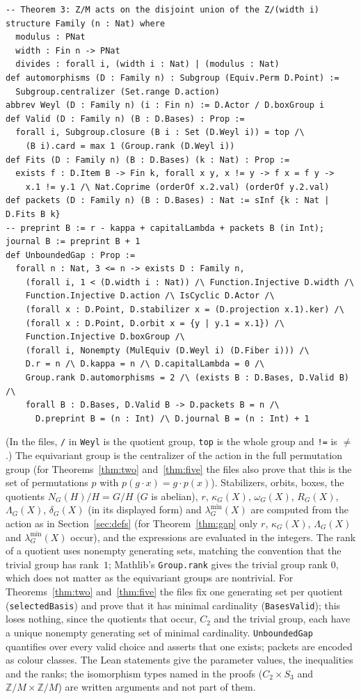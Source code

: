 \documentclass[11pt]{article}
\theoremstyle{remark}
\newcommand{\lmin}{\lambda^{\min}}
\begin{document}
{\begin{verbatim}
-- Theorem 3: Z/M acts on the disjoint union of the Z/(width i)
structure Family (n : Nat) where
  modulus : PNat
  width : Fin n -> PNat
  divides : forall i, (width i : Nat) | (modulus : Nat)
def automorphisms (D : Family n) : Subgroup (Equiv.Perm D.Point) :=
  Subgroup.centralizer (Set.range D.action)
abbrev Weyl (D : Family n) (i : Fin n) := D.Actor / D.boxGroup i
def Valid (D : Family n) (B : D.Bases) : Prop :=
  forall i, Subgroup.closure (B i : Set (D.Weyl i)) = top /\
    (B i).card = max 1 (Group.rank (D.Weyl i))
def Fits (D : Family n) (B : D.Bases) (k : Nat) : Prop :=
  exists f : D.Item B -> Fin k, forall x y, x != y -> f x = f y ->
    x.1 != y.1 /\ Nat.Coprime (orderOf x.2.val) (orderOf y.2.val)
def packets (D : Family n) (B : D.Bases) : Nat := sInf {k : Nat | D.Fits B k}
-- preprint B := r - kappa + capitalLambda + packets B (in Int); journal B := preprint B + 1
def UnboundedGap : Prop :=
  forall n : Nat, 3 <= n -> exists D : Family n,
    (forall i, 1 < (D.width i : Nat)) /\ Function.Injective D.width /\
    Function.Injective D.action /\ IsCyclic D.Actor /\
    (forall x : D.Point, D.stabilizer x = (D.projection x.1).ker) /\
    (forall x : D.Point, D.orbit x = {y | y.1 = x.1}) /\
    Function.Injective D.boxGroup /\
    (forall i, Nonempty (MulEquiv (D.Weyl i) (D.Fiber i))) /\
    D.r = n /\ D.kappa = n /\ D.capitalLambda = 0 /\
    Group.rank D.automorphisms = 2 /\ (exists B : D.Bases, D.Valid B) /\
    forall B : D.Bases, D.Valid B -> D.packets B = n /\
      D.preprint B = (n : Int) /\ D.journal B = (n : Int) + 1
\end{verbatim}}
\noindent (In the files, \texttt{/} in \texttt{Weyl} is the quotient group,
\texttt{top} is the whole group and \texttt{!=} is $\ne$.) The equivariant
group is the centralizer of the action in the full permutation group (for
Theorems~\ref{thm:two} and~\ref{thm:five} the files also prove that this is
the set of permutations $p$ with $p(g\cdot x)=g\cdot p(x)$). Stabilizers,
orbits, boxes, the quotients $N_G(H)/H=G/H$ ($G$ is abelian), $r$,
$\kappa_G(X)$, $\omega_G(X)$, $R_G(X)$, $\Lambda_G(X)$, $\delta_G(X)$ (in its
displayed form) and $\lmin_G(X)$ are computed from the action as in
Section~\ref{sec:defs} (for Theorem~\ref{thm:gap} only $r$, $\kappa_G(X)$,
$\Lambda_G(X)$ and $\lmin_G(X)$ occur), and the expressions are evaluated in
the integers.
The rank of a quotient uses nonempty generating sets, matching the convention
that the trivial group has rank~$1$; Mathlib's \texttt{Group.rank} gives the
trivial group rank $0$, which does not matter as the equivariant groups are
nontrivial. For Theorems~\ref{thm:two} and~\ref{thm:five} the files fix one
generating set per quotient (\texttt{selectedBasis}) and prove that it
has minimal cardinality (\texttt{BasesValid}); this loses nothing, since the
quotients that occur, $C_2$ and the trivial group, each have a unique nonempty
generating set of minimal cardinality. \texttt{UnboundedGap} quantifies over every valid choice and
asserts that one exists; packets are encoded as colour classes. The Lean
statements give the parameter values, the inequalities and the ranks; the
isomorphism types named in the proofs ($C_2\times S_3$ and
$\mathbb Z/M\times\mathbb Z/M$) are written arguments and not part of them.
\end{document}

